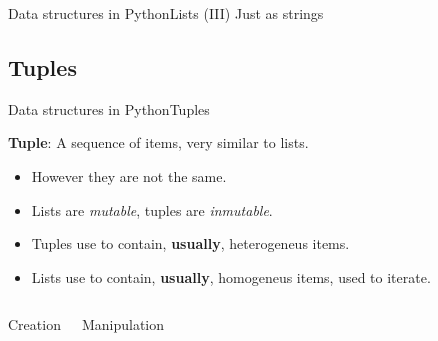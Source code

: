 \documentclass[10pt,compress]{beamer} %
\begin{document}
\begin{frame}[shrink]{Data structures in Python}{Lists (III)}
Just as strings
\scriptsize{
		\begin{block}{}
		\vspace{-0.4cm}
		
		\vspace{-0.2cm}
		\end{block}
		}
\end{frame}

\subsection{Tuples}
\begin{frame}{Data structures in Python}{Tuples}

	\textbf{Tuple}: A sequence of items, very similar to lists.
		\begin{itemize}
		\item \small However they are not the same.
		\item \small Lists are \textit{mutable}, tuples are \textit{inmutable}.
		\item \small Tuples use to contain, \textbf{usually}, heterogeneus items.
		\item \small Lists use to contain, \textbf{usually}, homogeneus items, used to iterate.
		\end{itemize}
	
	    \begin{columns}
 	   \column{.38\textwidth}
 	   \scriptsize{
		\begin{block}{Creation}
		\vspace{-0.2cm}
		
		\vspace{-0.2cm}
		\end{block}
		}
       \vspace{4cm}
 	   \column{.62\textwidth}
 	   \scriptsize{
		\begin{block}{Manipulation}
		\vspace{-0.2cm}
		
		\vspace{-0.3cm}	
		\end{block}
		}
		\vspace{2.9 cm}

	\end{columns}
\end{frame}
\end{document}

